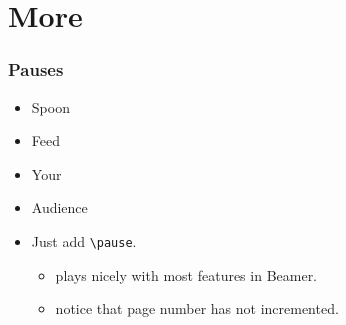 \documentclass[12pt]{beamer}
\begin{document}
\section{More}
\begin{frame}[fragile]
\frametitle{Pauses}

\begin{itemize}
\item{Spoon}
\pause
\item{Feed}
\pause
\item{Your}
\pause
\item{Audience}
\pause
\item Just add \texttt{\textbackslash pause}.
\pause
\begin{itemize}
\item plays nicely with most features in Beamer.
\pause
\item notice that page number has not incremented.
\end{itemize}
\end{itemize}

\end{frame}
\end{document}
